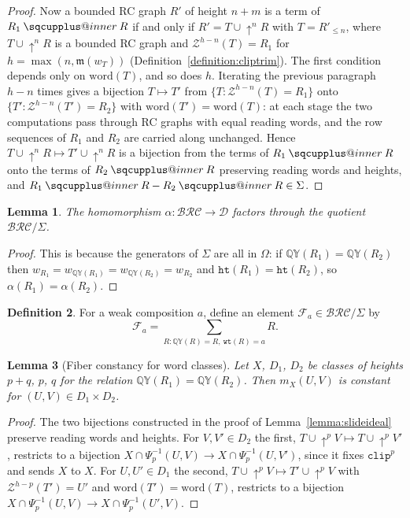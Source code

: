 \documentclass{amsart}
\makeatletter
\newcommand{\sqcupplus@inner}[2]{%
  \vcenter{\hbox{\ooalign{%
    \hfil$\m@th#1\sqcup$\hfil\cr
    \hfil\raisebox{0.15ex}{$\m@th#1\scriptscriptstyle+$}\hfil\cr
  }}}%
}
\newcommand{\sqcupplus}{\mathbin{\mathpalette\sqcupplus@inner\relax}}
\newtheorem{lemma}{Lemma}[subsection]
\theoremstyle{definition}
\newtheorem{definition}[lemma]{Definition}
\theoremstyle{remark}
\numberwithin{equation}{subsection}
\newcommand{\shup}{{\uparrow}}
\newcommand{\wof}[1]{w_{#1}}
\newcommand{\wtt}{\mathtt{wt}}
\newcommand{\QY}{\ensuremath{\mathbb{QY}}}
\newcommand{\zeromap}{\mathcal{Z}}
\newcommand{\hr}{\mathtt{ht}}
\newcommand{\clp}{\mathtt{clip}}
\newcommand{\BRC}{\mathcal{BRC}}
\newcommand{\dcoma}{\mathcal{D}}
\newcommand{\maxd}{\mathfrak{m}}
\makeatother
\begin{document}
\begin{proof}
Now a bounded RC graph $R'$ of height $n+m$ is a term of $R_1\sqcupplus R$ if and only if $R'=T\cup\shup^nR$ with $T=R'_{\leq n}$, where $T\cup\shup^nR$ is a bounded RC graph and $\zeromap^{h-n}(T)=R_1$ for $h=\max(n,\maxd(\wof T))$ (Definition~\ref{definition:cliptrim}). The first condition depends only on $\mathrm{word}(T)$, and so does $h$. Iterating the previous paragraph $h-n$ times gives a bijection $T\mapsto T'$ from $\{T:\zeromap^{h-n}(T)=R_1\}$ onto $\{T':\zeromap^{h-n}(T')=R_2\}$ with $\mathrm{word}(T')=\mathrm{word}(T)$: at each stage the two computations pass through RC graphs with equal reading words, and the row sequences of $R_1$ and $R_2$ are carried along unchanged. Hence $T\cup\shup^nR\mapsto T'\cup\shup^nR$ is a bijection from the terms of $R_1\sqcupplus R$ onto the terms of $R_2\sqcupplus R$ preserving reading words and heights, and $R_1\sqcupplus R-R_2\sqcupplus R\in\Sigma$.
\end{proof}

\begin{lemma}
The homomorphism $\alpha:\BRC\to\dcoma$ factors through the quotient $\BRC/\Sigma$.
\end{lemma}
\begin{proof}
This is because the generators of $\Sigma$ are all in $\Omega$: if $\QY(R_1)=\QY(R_2)$ then $\wof{R_1}=\wof{\QY(R_1)}=\wof{\QY(R_2)}=\wof{R_2}$ and $\hr(R_1)=\hr(R_2)$, so $\alpha(R_1)=\alpha(R_2)$.
\end{proof}

\begin{definition}
For a weak composition $a$, define an element $\mathcal{F}_a\in\BRC/\Sigma$ by
$$\mathcal{F}_a=\sum_{R: \QY(R)=R,\ \wtt(R)=a} R.$$
\end{definition}

\begin{lemma}[Fiber constancy for word classes]\label{lemma:slidefibers}
Let $X$, $D_1$, $D_2$ be classes of heights $p+q$, $p$, $q$ for the relation $\QY(R_1)=\QY(R_2)$. Then $m_X(U,V)$ is constant for $(U,V)\in D_1\times D_2$.
\end{lemma}
\begin{proof}
The two bijections constructed in the proof of Lemma~\ref{lemma:slideideal} preserve reading words and heights. For $V,V'\in D_2$ the first, $T\cup\shup^pV\mapsto T\cup\shup^pV'$, restricts to a bijection $X\cap\Psi_p^{-1}(U,V)\to X\cap\Psi_p^{-1}(U,V')$, since it fixes $\clp^p$ and sends $X$ to $X$. For $U,U'\in D_1$ the second, $T\cup\shup^pV\mapsto T'\cup\shup^pV$ with $\zeromap^{h-p}(T')=U'$ and $\mathrm{word}(T')=\mathrm{word}(T)$, restricts to a bijection $X\cap\Psi_p^{-1}(U,V)\to X\cap\Psi_p^{-1}(U',V)$.
\end{proof}
\end{document}
